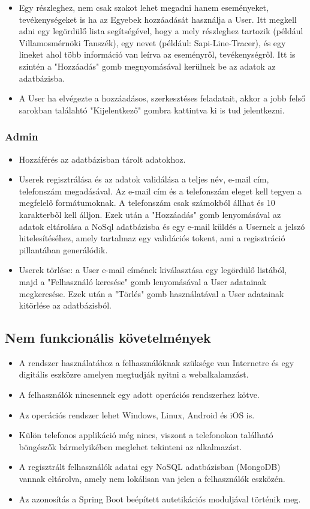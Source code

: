 \begin{itemize}
	\item Egy részleghez, nem csak szakot lehet megadni hanem eseményeket, tevékenységeket is ha az Egyebek hozzáadását használja a User. Itt megkell adni egy legördülő lista segítségével, hogy a mely részleghez tartozik (például Villamosmérnöki Tanszék), egy nevet (például: Sapi-Line-Tracer), és egy lineket ahol több információ van leírva az eseményről, tevékenységről. Itt is szintén a "Hozzáadás" gomb megnyomásával kerülnek be az adatok az adatbázisba.
	\item A User ha elvégezte a hozzáadásos, szerkesztéses feladatait, akkor a jobb felső sarokban találahtó "Kijelentkező" gombra kattintva ki is tud jelentkezni.
\end{itemize}

\subsubsection{Admin}
\begin{itemize}
	\item Hozzáférés az adatbázisban tárolt adatokhoz.
	\item Userek regisztrálása és az adatok validálása a teljes név, e-mail cím, telefonszám megadásával. Az e-mail cím és a telefonszám eleget kell tegyen a megfelelő formátumoknak. A telefonszám csak számokból állhat és 10 karakterből kell álljon. Ezek után a "Hozzáadás" gomb lenyomásával az adatok eltárolása a NoSql adatbázisba és egy e-mail küldés a Usernek a jelszó hitelesítéséhez, amely tartalmaz egy validációs tokent, ami a regisztráció pillantában generálódik.
	\item Userek törlése: a User e-mail címének kiválasztása egy legördülő listából, majd a "Felhasználó keresése" gomb lenyomásával a User adatainak megkeresése. Ezek után a "Törlés" gomb használatával a User adatainak kitörlése az adatbázisból.
\end{itemize}

\subsection{Nem funkcionális követelmények}

\begin{itemize}
\item A rendszer használatához a felhasználóknak szüksége van Internetre és egy digitális eszközre amelyen megtudják nyitni a webalkalamzást. 
\item A felhasználók nincsennek egy adott operációs rendszerhez kötve. 
\item Az operációs rendszer lehet Windows, Linux, Android és iOS is. 
\item Külön telefonos applikáció még nincs, viszont a telefonokon található böngészők bármelyikében meglehet tekinteni az alkalmazást.
\item A regisztrált felhasználók adatai egy NoSQL adatbázisban (MongoDB) vannak eltárolva, amely nem lokálisan van jelen a felhasználók eszközén.
\item Az azonosítás a Spring Boot beépített autetikációs moduljával történik meg.
\end{itemize}